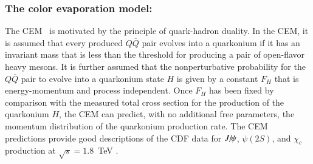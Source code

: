 \documentclass[review]{elsarticle}
\newcommand{\Jpsi}{\ensuremath{J\hspace{-.08em}/\hspace{-.14em}\psi}\xspace} %
\newcommand{\QQbar}{\ensuremath{Q \overline{Q}\xspace}\xspace}
\begin{document}
\subsubsection{The color evaporation model:}  
\label{prod_sec:CEM}

The CEM~\cite{Fritzsch:1977ay,Amundson:1995em,Amundson:1996qr}
is motivated by the principle of quark-hadron duality. In the CEM, it
is assumed that every produced $\QQbar$ pair evolves into a quarkonium
if it has an invariant mass that is less than the threshold for
producing a pair of open-flavor heavy mesons. It is further assumed that
the nonperturbative probability for the $\QQbar$ pair to evolve into a
quarkonium state $H$ is given by a constant $F_H$ that is
energy-momentum and process independent. Once $F_H$ has been fixed by
comparison with the measured total cross section for the production of
the quarkonium $H$, the CEM can predict, with no additional free
parameters, the momentum distribution of the quarkonium production rate. The
CEM predictions provide good descriptions of the CDF data for $\Jpsi$,
$\psi(2S)$, and $\chi_{c}$ production at $\sqrt{s}=1.8$~TeV
\cite{Amundson:1996qr}. 

\end{document}
